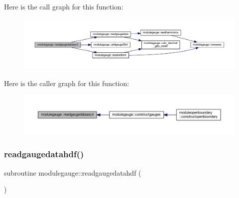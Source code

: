 Here is the call graph for this function\+:\nopagebreak
\begin{figure}[H]
\begin{center}
\leavevmode
\includegraphics[width=350pt]{namespacemodulegauge_a6f6a7638c9e37ab7f5461866ec475f03_cgraph}
\end{center}
\end{figure}
Here is the caller graph for this function\+:\nopagebreak
\begin{figure}[H]
\begin{center}
\leavevmode
\includegraphics[width=350pt]{namespacemodulegauge_a6f6a7638c9e37ab7f5461866ec475f03_icgraph}
\end{center}
\end{figure}
\mbox{\label{namespacemodulegauge_a26f00d7d5cd5edd1ce28da62855cb19f}} 
\subsubsection{\texorpdfstring{readgaugedatahdf()}{readgaugedatahdf()}}
{\footnotesize\ttfamily subroutine modulegauge\+::readgaugedatahdf (\begin{DoxyParamCaption}{ }\end{DoxyParamCaption})\hspace{0.3cm}{\ttfamily [private]}}

